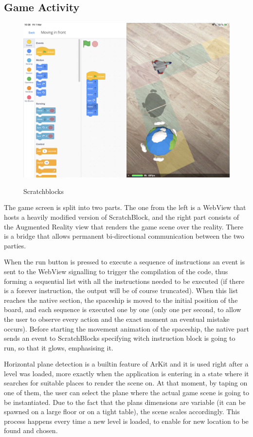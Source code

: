 \documentclass[12 pct]{report}
\begin{document}
\subsection*{Game Activity}
\begin{figure}[H]
\includegraphics[width=1.0\textwidth]{ArRobotCode2}
\centering
\label{fig:hololens}
\caption{Scratchblocks}
\end{figure}
The game screen is split into two parts. The one from the left is a WebView that hosts a heavily modified version of ScratchBlock, and the right part consists of the Augmented Reality view that renders the game scene over the reality. There is a bridge that allows permanent bi-directional communication between the two parties.

When the run button is pressed to execute a sequence of instructions an event is sent to the WebView signalling to trigger the compilation of the code, thus forming a sequential list with all the instructions needed to be executed (if there is a forever instruction, the output will be of course truncated). When this list reaches the native section, the spaceship is moved to the initial position of the board, and each sequence is executed one by one (only one per second, to allow the user to observe every action and the exact moment an eventual mistake occurs). Before starting the movement animation of the spaceship, the native part sends an event to ScratchBlocks specifying witch instruction block is going to run, so that it glows, emphasising it.

Horizontal plane detection is a builtin feature of ArKit and it is used right after a level was loaded, more exactly when the application is entering in a state where it searches for suitable places to render the scene on. At that moment, by taping on one of them, the user can select the plane where the actual game scene is going to be instantiated. Due to the fact that the plans dimensions are variable (it can be spawned on a large floor or on a tight table), the scene scales accordingly. This process happens every time a new level is loaded, to enable for new location to be found and chosen.
\end{document}

